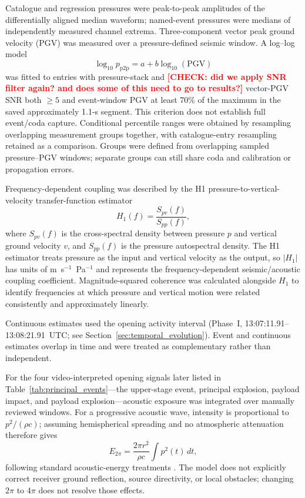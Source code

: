 \documentclass[]{seismica}
\newcommand{\checkme}[1]{\textcolor{red}{\textbf{[CHECK: #1]}}}
\begin{document}
Catalogue and regression pressures were peak-to-peak amplitudes of the
differentially aligned median waveform; named-event pressures were medians
of independently measured channel extrema. Three-component vector peak ground
velocity (PGV) was measured over a pressure-defined seismic window. A log--log model
\begin{equation}
 \log_{10}p_{\mathrm{p2p}}=a+b\log_{10}(\mathrm{PGV})
 \label{eq:power_law}
\end{equation}
was fitted to entries with pressure-stack and \checkme{did we apply SNR filter again? and does some of this need to go to results?}
vector-PGV SNR both $\geq5$
and event-window PGV at least 70\% of the maximum in the saved approximately
1.1-s segment. This criterion does not establish full event/coda capture. Conditional percentile ranges were obtained by
resampling overlapping measurement groups together, with catalogue-entry
resampling retained as a comparison. Groups were defined from overlapping
sampled pressure--PGV windows; separate groups can still share coda and
calibration or propagation errors.

Frequency-dependent coupling was described by the H1
pressure-to-vertical-velocity transfer-function estimator
\begin{equation}
 H_1(f)=\frac{S_{pv}(f)}{S_{pp}(f)},
 \label{eq:h1_transfer}
\end{equation}
where $S_{pv}(f)$ is the cross-spectral density between pressure $p$ and
vertical ground velocity $v$, and $S_{pp}(f)$ is the pressure autospectral
density. The H1 estimator treats pressure as the input and vertical velocity
as the output, so $|H_1|$ has units of m~s$^{-1}$~Pa$^{-1}$ and represents
the frequency-dependent seismic/acoustic coupling coefficient. Magnitude-squared
coherence was calculated alongside $H_1$ to identify frequencies at which
pressure and vertical motion were related consistently and approximately
linearly.

Continuous estimates used the opening activity interval
(Phase~I, 13:07:11.91--13:08:21.91~UTC; see
Section~\ref{sec:temporal_evolution}). Event and continuous estimates overlap
in time and were treated as complementary rather than independent.


For the four video-interpreted opening signals later listed in
Table~\ref{tab:principal_events}---the upper-stage event, principal explosion,
payload impact, and payload explosion---acoustic exposure
was integrated over manually reviewed windows. For a progressive acoustic wave,
intensity is proportional to $p^2/(\rho c)$; assuming hemispherical spreading
and no atmospheric attenuation therefore gives
\begin{equation}
 E_{2\pi}=\frac{2\pi r^2}{\rho c}\int p^2(t)\,dt,
 \label{eq:acoustic_energy}
\end{equation}
following standard acoustic-energy treatments
\citep[e.g.,][]{johnson_aster_2005}.
The model does not explicitly correct receiver ground reflection, source
directivity, or local obstacles; changing $2\pi$ to $4\pi$ does not resolve
those effects.
\end{document}
